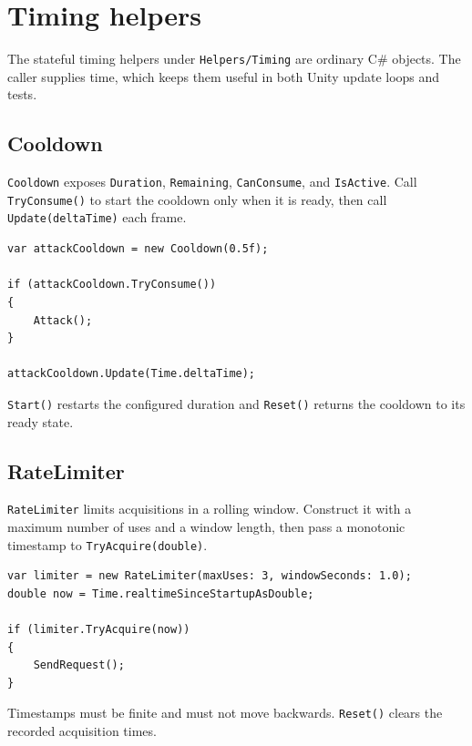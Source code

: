 \section{Timing helpers}
\label{sec:timing}

The stateful timing helpers under \texttt{Helpers/Timing} are ordinary C\# objects. The caller supplies time, which keeps them useful in both Unity update loops and tests.

\subsection{Cooldown}
\texttt{Cooldown} exposes \texttt{Duration}, \texttt{Remaining}, \texttt{CanConsume}, and \texttt{IsActive}. Call \texttt{TryConsume()} to start the cooldown only when it is ready, then call \texttt{Update(deltaTime)} each frame.

\begin{lstlisting}
var attackCooldown = new Cooldown(0.5f);

if (attackCooldown.TryConsume())
{
    Attack();
}

attackCooldown.Update(Time.deltaTime);
\end{lstlisting}

\texttt{Start()} restarts the configured duration and \texttt{Reset()} returns the cooldown to its ready state.

\subsection{RateLimiter}
\texttt{RateLimiter} limits acquisitions in a rolling window. Construct it with a maximum number of uses and a window length, then pass a monotonic timestamp to \texttt{TryAcquire(double)}.

\begin{lstlisting}
var limiter = new RateLimiter(maxUses: 3, windowSeconds: 1.0);
double now = Time.realtimeSinceStartupAsDouble;

if (limiter.TryAcquire(now))
{
    SendRequest();
}
\end{lstlisting}

Timestamps must be finite and must not move backwards. \texttt{Reset()} clears the recorded acquisition times.
